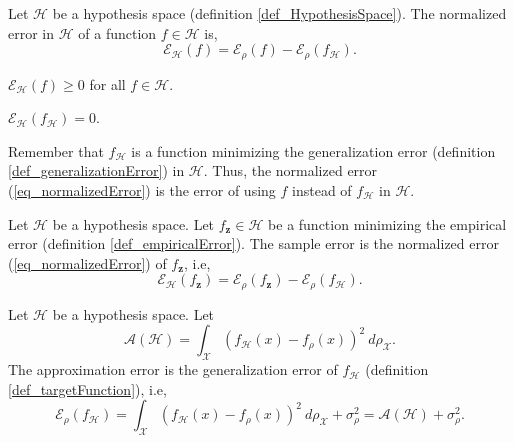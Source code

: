 \begin{definition} Let $\mathcal{H}$ be a hypothesis space (definition \ref{def_HypothesisSpace}). The normalized error in $\mathcal{H}$ of a function $f \in \mathcal{H}$ is,
  \begin{equation} \label{eq_normalizedError}
    \mathcal{E}_{\mathcal{H}}(f) = \mathcal{E}_{\rho}(f) - \mathcal{E}_{\rho}(f_{\mathcal{H}}).
  \end{equation}
\end{definition}

\begin{remark} 
  $\mathcal{E}_{\mathcal{H}}(f) \geq 0$ for all $f \in \mathcal{H}$.
\end{remark}

\begin{remark} 
  $\mathcal{E}_{\mathcal{H}}(f_{\mathcal{H}}) = 0$.
\end{remark}

Remember that $f_{\mathcal{H}}$ is a function minimizing the generalization error (definition \ref{def_generalizationError}) in $\mathcal{H}$. Thus, the normalized error (\ref{eq_normalizedError}) is the error of using $f$ instead of $f_{\mathcal{H}}$ in $\mathcal{H}$.

\begin{definition} Let $\mathcal{H}$ be a hypothesis space. Let $f_{\pmb{z}} \in \mathcal{H}$ be a function minimizing the empirical error (definition \ref{def_empiricalError}). The sample error is the normalized error (\ref{eq_normalizedError}) of $f_{\pmb{z}}$, i.e,
  \begin{equation} \label{eq_sampleError}
    \mathcal{E}_{\mathcal{H}}(f_{\pmb{z}}) = \mathcal{E}_{\rho}(f_{\pmb{z}}) - \mathcal{E}_{\rho}(f_{\mathcal{H}}).
  \end{equation}
\end{definition}

\begin{definition}
  Let $\mathcal{H}$ be a hypothesis space. 
  Let
  \begin{equation*}
    \mathcal{A}(\mathcal{H}) = \int_{\mathcal{X}} (f_{\mathcal{H}}(x) - f_{\rho}(x))^2 \ d\rho_{\mathcal{X}}.
  \end{equation*}
  The approximation error is the generalization error of $f_{\mathcal{H}}$ (definition \ref{def_targetFunction}), i.e,
  \begin{equation} \label{eq_approximationError}
    \mathcal{E}_{\rho}(f_{\mathcal{H}}) 
                      = \int_{\mathcal{X}} (f_{\mathcal{H}}(x) - f_{\rho}(x))^2 \ d\rho_{\mathcal{X}} + \sigma_{\rho}^2 
                      = \mathcal{A}(\mathcal{H}) + \sigma_{\rho}^2. 
  \end{equation}
\end{definition}

